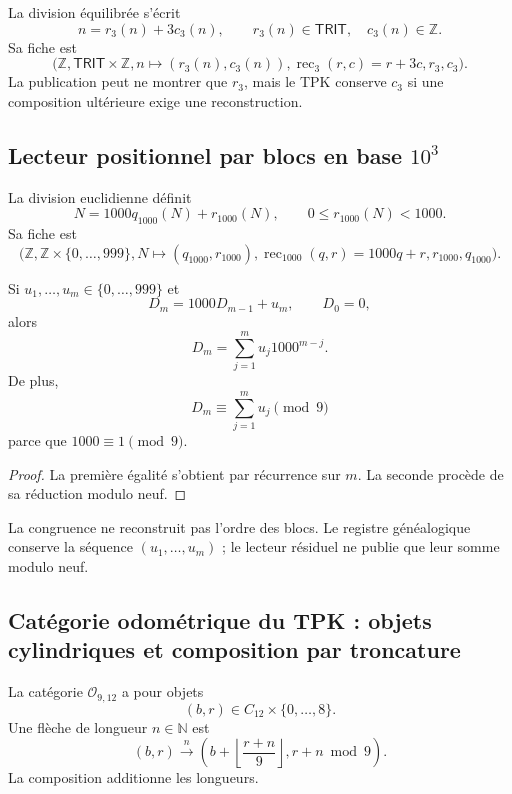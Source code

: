 La division équilibrée s’écrit
\[
 n=r_3(n)+3c_3(n),
 \qquad r_3(n)\in\mathsf{TRIT},\quad c_3(n)\in\mathbb Z.
\]
Sa fiche est
\[
 \bigl(
 \mathbb Z,\mathsf{TRIT}\times\mathbb Z,
 n\mapsto(r_3(n),c_3(n)),
 \operatorname{rec}_3(r,c)=r+3c,
 r_3,
 c_3
 \bigr).
\]
La publication peut ne montrer que \(r_3\), mais le TPK conserve
\(c_3\) si une composition ultérieure exige une reconstruction.

\subsection{Lecteur positionnel par blocs en base \(10^3\)}

La division euclidienne définit
\[
 N=1000q_{1000}(N)+r_{1000}(N),
 \qquad 0\leq r_{1000}(N)<1000.
\]
Sa fiche est
\[
 \bigl(
 \mathbb Z,\mathbb Z\times\{0,\ldots,999\},
 N\mapsto(q_{1000},r_{1000}),
 \operatorname{rec}_{1000}(q,r)=1000q+r,
 r_{1000},
 q_{1000}
 \bigr).
\]

\begin{proposition}
\label{p12-83-c1-s13:prop:tpk-concatenacion-base-mil}
Si \(u_1,\ldots,u_m\in\{0,\ldots,999\}\) et
\[
 D_m=1000D_{m-1}+u_m,
 \qquad D_0=0,
\]
alors
\[
 D_m=\sum_{j=1}^m u_j1000^{m-j}.
\]
De plus,
\[
 D_m\equiv\sum_{j=1}^m u_j\pmod9
\]
parce que \(1000\equiv1\pmod9\).
\end{proposition}

\begin{proof}
La première égalité s’obtient par récurrence sur \(m\). La seconde procède
de sa réduction modulo neuf.
\end{proof}

La congruence ne reconstruit pas l’ordre des blocs. Le registre généalogique conserve la
séquence \((u_1,\ldots,u_m)\) ; le lecteur résiduel ne publie que leur somme
modulo neuf.

\subsection{Catégorie odométrique du TPK : objets cylindriques et composition par troncature}

\begin{definition}
\label{p12-83-c1-s13:def:tpk-odometro-9-12}
La catégorie \(\mathcal O_{9,12}\) a pour objets
\[
 (b,r)\in C_{12}\times\{0,\ldots,8\}.
\]
Une flèche de longueur \(n\in\mathbb N\) est
\[
 (b,r)\xrightarrow{\ n\ }
 \left(
  b+\left\lfloor\frac{r+n}{9}\right\rfloor,
  r+n\bmod9
 \right).
\]
La composition additionne les longueurs.
\end{definition}

